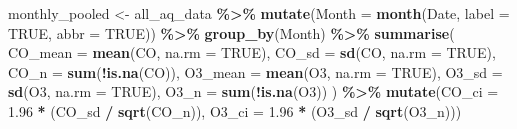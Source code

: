 \documentclass[
]{article}
\newenvironment{Shaded}{\begin{snugshade}}{\end{snugshade}}
\newcommand{\AttributeTok}[1]{\textcolor[rgb]{0.13,0.29,0.53}{#1}}
\newcommand{\ConstantTok}[1]{\textcolor[rgb]{0.56,0.35,0.01}{#1}}
\newcommand{\FloatTok}[1]{\textcolor[rgb]{0.00,0.00,0.81}{#1}}
\newcommand{\FunctionTok}[1]{\textcolor[rgb]{0.13,0.29,0.53}{\textbf{#1}}}
\newcommand{\NormalTok}[1]{#1}
\newcommand{\OtherTok}[1]{\textcolor[rgb]{0.56,0.35,0.01}{#1}}
\newcommand{\SpecialCharTok}[1]{\textcolor[rgb]{0.81,0.36,0.00}{\textbf{#1}}}
\begin{document}
\begin{Shaded}
\begin{Highlighting}[]
\NormalTok{monthly\_pooled }\OtherTok{\textless{}{-}}\NormalTok{ all\_aq\_data }\SpecialCharTok{\%\textgreater{}\%}
  \FunctionTok{mutate}\NormalTok{(}\AttributeTok{Month =} \FunctionTok{month}\NormalTok{(Date, }\AttributeTok{label =} \ConstantTok{TRUE}\NormalTok{, }\AttributeTok{abbr =} \ConstantTok{TRUE}\NormalTok{)) }\SpecialCharTok{\%\textgreater{}\%}
  \FunctionTok{group\_by}\NormalTok{(Month) }\SpecialCharTok{\%\textgreater{}\%}
  \FunctionTok{summarise}\NormalTok{(}
    \AttributeTok{CO\_mean =} \FunctionTok{mean}\NormalTok{(CO, }\AttributeTok{na.rm =} \ConstantTok{TRUE}\NormalTok{), }\AttributeTok{CO\_sd =} \FunctionTok{sd}\NormalTok{(CO, }\AttributeTok{na.rm =} \ConstantTok{TRUE}\NormalTok{), }\AttributeTok{CO\_n =} \FunctionTok{sum}\NormalTok{(}\SpecialCharTok{!}\FunctionTok{is.na}\NormalTok{(CO)),}
    \AttributeTok{O3\_mean =} \FunctionTok{mean}\NormalTok{(O3, }\AttributeTok{na.rm =} \ConstantTok{TRUE}\NormalTok{), }\AttributeTok{O3\_sd =} \FunctionTok{sd}\NormalTok{(O3, }\AttributeTok{na.rm =} \ConstantTok{TRUE}\NormalTok{), }\AttributeTok{O3\_n =} \FunctionTok{sum}\NormalTok{(}\SpecialCharTok{!}\FunctionTok{is.na}\NormalTok{(O3))}
\NormalTok{  ) }\SpecialCharTok{\%\textgreater{}\%}
  \FunctionTok{mutate}\NormalTok{(}\AttributeTok{CO\_ci =} \FloatTok{1.96} \SpecialCharTok{*}\NormalTok{ (CO\_sd }\SpecialCharTok{/} \FunctionTok{sqrt}\NormalTok{(CO\_n)), }\AttributeTok{O3\_ci =} \FloatTok{1.96} \SpecialCharTok{*}\NormalTok{ (O3\_sd }\SpecialCharTok{/} \FunctionTok{sqrt}\NormalTok{(O3\_n)))}


\end{Highlighting}
\end{Shaded}
\end{document}

